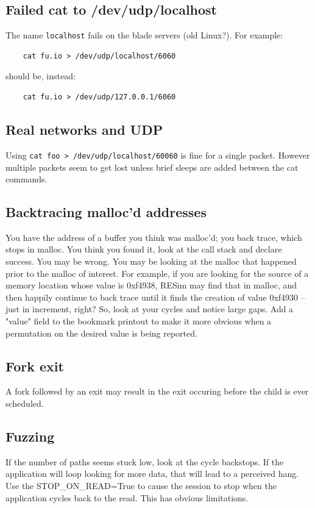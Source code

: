 \documentclass[titlepage]{article}
\begin{document}
\begin{appendices}
\subsection{Failed cat to /dev/udp/localhost}
The name {\tt localhost} fails on the blade servers (old Linux?).   For example:
\begin{verbatim}
    cat fu.io > /dev/udp/localhost/6060
\end{verbatim}
\noindent should be, instead:
\begin{verbatim}
    cat fu.io > /dev/udp/127.0.0.1/6060
\end{verbatim}

\subsection{Real networks and UDP}
Using {\tt cat foo > /dev/udp/localhost/60060} is fine for a single packet.  However multiple packets seem to get lost unless brief sleeps are
added between the cat commands.

\subsection{Backtracing malloc'd addresses}
You have the address of a buffer you think was malloc'd; you back trace, which stops in malloc.  You think you found it, look at the call stack and
declare success.  You may be wrong.  You may be looking at the malloc that happened prior to the malloc of interest.  For example, if you are looking
for the source of a memory location whose value is 0xf4938, RESim may find that in malloc, and then happily continue to back trace until it finds
the creation of value 0xf4930  -- just in increment, right?  So, look at your cycles and notice large gaps.
Add a "value" field to the bookmark printout to make it more obvious when a permutation on the desired value is being reported.

\subsection{Fork exit}
A fork followed by an exit may result in the exit occuring before the child is ever scheduled.

\subsection{Fuzzing}
If the number of paths seems stuck low, look at the cycle backstops.  If the application will loop looking for more data, that will lead to a perceived
hang.  Use the STOP\_ON\_READ=True to cause the session to stop when the application cycles back to the read.  This has obvious limitations.

\end{appendices}
\end{document}
